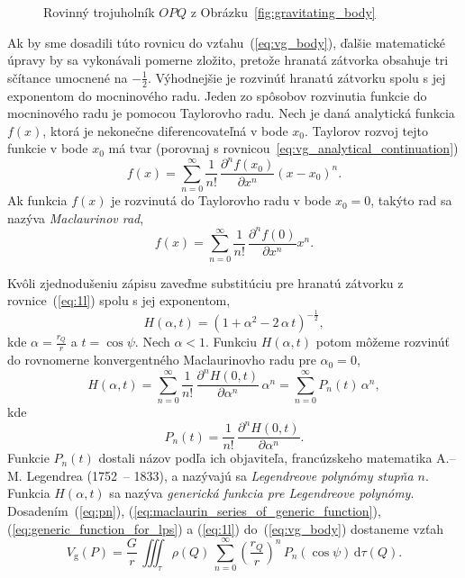 \documentclass[a4paper, 12pt]{book}
\newcommand{\diff}{\mathrm d}
\newcommand{\gidx}{\mathrm g}
\begin{document}
\begin{figure}
\centering

\caption{Rovinný trojuholník $OPQ$ z Obrázku~\ref{fig:gravitating_body}}
\label{fig:distance_l}
\end{figure}

Ak by sme dosadili túto rovnicu do vzťahu~(\ref{eq:vg_body}), ďalšie 
matematické úpravy by sa vykonávali pomerne zložito, pretože hranatá zátvorka 
obsahuje tri sčítance umocnené na $-\frac{1}{2}$.  Výhodnejšie je rozvinúť 
hranatú zátvorku spolu s jej exponentom do mocninového radu.  Jeden zo spôsobov 
rozvinutia funkcie do mocninového radu je pomocou Taylorovho radu.  Nech je 
daná analytická funkcia $f(x)$, ktorá je nekonečne diferencovateľná v bode 
$x_0$.  Taylorov rozvoj tejto funkcie v bode $x_0$ má tvar (porovnaj 
s rovnicou~\ref{eq:vg_analytical_continuation})
%
\begin{equation}
f(x) = \sum_{n = 0}^\infty \frac{1}{n!} \, \frac{\partial^n f(x_0)}{\partial 
x^n} \left( x - x_0 \right)^n{.}
\end{equation}
%
Ak funkcia $f(x)$ je rozvinutá do Taylorovho radu v bode $x_0 = 0$, takýto rad 
sa nazýva \emph{Maclaurinov rad},
%
\begin{equation}
f(x) = \sum_{n = 0}^\infty \frac{1}{n!} \, \frac{\partial^n f(0)}{\partial x^n} 
x^n{.}
\end{equation}

Kvôli zjednodušeniu zápisu zaveďme substitúciu pre hranatú zátvorku 
z rovnice~(\ref{eq:1l}) spolu s jej exponentom,
%
\begin{equation}
\label{eq:generic_function_for_lps}
H(\alpha, t) = \left(1 + \alpha^2 - 2 \, \alpha\, t \right)^{-\frac{1}{2}}{,}
\end{equation}
%
kde $\alpha = \frac{r_Q}{r}$ a $t = \cos\psi$.  Nech $\alpha < 1$.  Funkciu 
$H(\alpha, t)$ potom môžeme rozvinúť do rovnomerne konvergentného Maclaurinovho 
radu pre $\alpha_0 = 0$,
%
\begin{equation}
\label{eq:maclaurin_series_of_generic_function}
H(\alpha, t) = \sum_{n = 0}^\infty \frac{1}{n!} \, \frac{\partial^n H(0, 
t)}{\partial \alpha^n} \, \alpha^n = \sum_{n = 0}^\infty P_n(t) \, \alpha^n{,}
\end{equation}
%
kde
%
\begin{equation}
\label{eq:pn}
P_n(t) = \frac{1}{n!} \, \frac{\partial^n H(0, t)}{\partial \alpha^n}{.}
\end{equation}
%
Funkcie $P_n(t)$ dostali názov podľa ich objaviteľa, francúzskeho matematika 
A.--M. Legendrea (1752~-- 1833), a nazývajú sa \emph{Legendreove polynómy 
stupňa $n$}.  Funkcia $H(\alpha, t)$ sa nazýva \emph{generická funkcia pre 
Legendreove polynómy}.  Dosadením~(\ref{eq:pn}), 
(\ref{eq:maclaurin_series_of_generic_function}), 
(\ref{eq:generic_function_for_lps}) a (\ref{eq:1l}) do~(\ref{eq:vg_body}) 
dostaneme vzťah
%
\begin{equation}
\label{eq:vg_legpol}
V_\gidx(P) = \frac{G}{r} \, \iiint_{\tau} \rho(Q) \, \sum_{n = 0}^{\infty} 
\left( \frac{r_Q}{r} \right)^n \, P_n(\cos\psi) \, \diff\tau(Q){.}
\end{equation}
\end{document}
